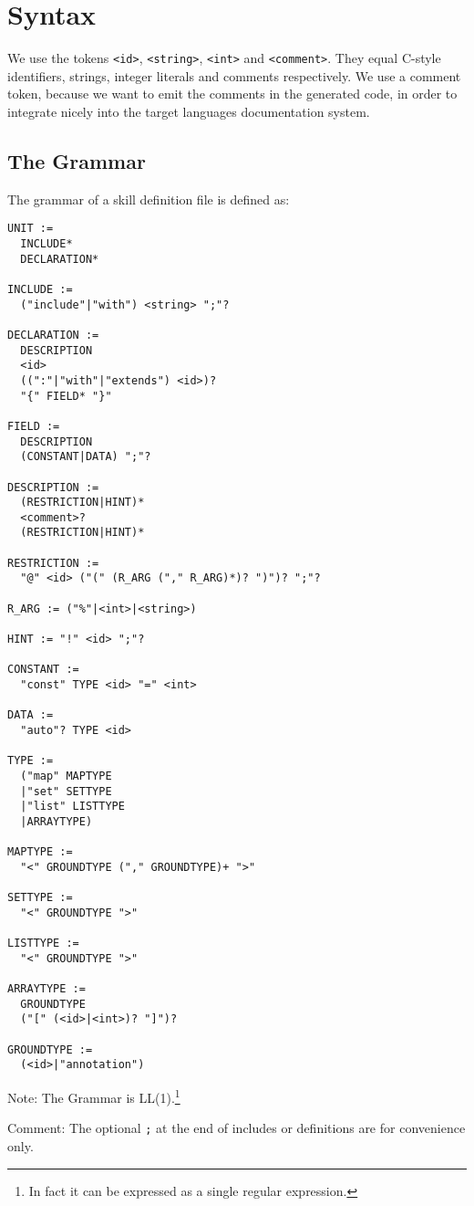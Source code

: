 \documentclass[a4paper,10pt]{article}
\begin{document}
\section{Syntax}

We use the tokens \verb/<id>/, \verb/<string>/, \verb/<int>/ and \verb/<comment>/. They equal C-style identifiers, strings, integer literals and comments respectively. We use a comment token, because we want to emit the comments in the generated code, in order to integrate nicely into the target languages documentation system.

\subsection{The Grammar}
The grammar of a \gls{skill} definition file is defined as:
\begin{verbatim}
UNIT :=
  INCLUDE*
  DECLARATION*

INCLUDE := 
  ("include"|"with") <string> ";"?

DECLARATION :=
  DESCRIPTION
  <id>
  ((":"|"with"|"extends") <id>)?
  "{" FIELD* "}"
  
FIELD :=
  DESCRIPTION
  (CONSTANT|DATA) ";"?
  
DESCRIPTION := 
  (RESTRICTION|HINT)*
  <comment>?
  (RESTRICTION|HINT)*
  
RESTRICTION :=
  "@" <id> ("(" (R_ARG ("," R_ARG)*)? ")")? ";"?
  
R_ARG := ("%"|<int>|<string>)

HINT := "!" <id> ";"?
  
CONSTANT :=
  "const" TYPE <id> "=" <int>
  
DATA :=
  "auto"? TYPE <id>
  
TYPE :=
  ("map" MAPTYPE
  |"set" SETTYPE
  |"list" LISTTYPE
  |ARRAYTYPE)
  
MAPTYPE :=
  "<" GROUNDTYPE ("," GROUNDTYPE)+ ">"
  
SETTYPE :=
  "<" GROUNDTYPE ">"
  
LISTTYPE :=
  "<" GROUNDTYPE ">"
  
ARRAYTYPE :=
  GROUNDTYPE
  ("[" (<id>|<int>)? "]")?
  
GROUNDTYPE :=
  (<id>|"annotation")

\end{verbatim}
Note: The Grammar is LL(1).\footnote{In fact it can be expressed as a single regular expression.}

Comment: The optional \texttt{;} at the end of includes or definitions are for convenience only.
\end{document}
